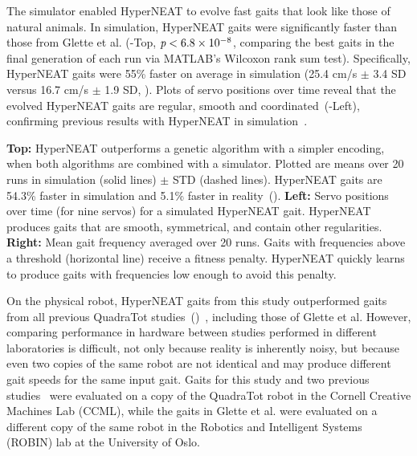 

The simulator enabled HyperNEAT to evolve
fast gaits that look like those of natural animals. In simulation, HyperNEAT gaits were significantly faster than those from Glette et al. (-Top, $\emph{p} < 6.8\times10^{-8}$, comparing the best gaits in the final generation of each run via MATLAB's Wilcoxon rank sum test).  
Specifically, HyperNEAT gaits were 55\% faster on average in simulation (25.4
cm/s $\pm$ 3.4 SD versus 16.7 cm/s $\pm$ 1.9 SD, ).
Plots of servo positions over time reveal that the evolved HyperNEAT gaits are regular, smooth and coordinated~(-Left), confirming previous results with HyperNEAT in simulation~\cite{clune2009evolving,clune2011performance}.

{
\textbf{Top: }
HyperNEAT outperforms a genetic algorithm with a simpler encoding, when both algorithms are combined with a simulator. Plotted are means over 20 runs in simulation (solid lines) $\pm$ STD (dashed lines). HyperNEAT gaits are 54.3\% faster in
simulation and 5.1\% faster in reality~().
\textbf{Left: }
Servo positions over time (for nine servos) for a simulated HyperNEAT gait. HyperNEAT produces gaits that are smooth, symmetrical, and contain other regularities. 
\textbf{Right: }Mean gait frequency averaged over 20 runs. 
Gaits with frequencies above a threshold (horizontal line) receive a fitness penalty. HyperNEAT quickly learns to produce gaits with frequencies low enough to avoid this penalty.
}


On the physical robot, HyperNEAT gaits from this study outperformed gaits from all previous QuadraTot studies~()~\cite{yos:clune,haocheng,glette}, including those of Glette et al. 
 However, comparing performance in hardware between studies performed in
different laboratories is difficult, not only because reality is
inherently noisy, but because even two copies of the same robot are
not identical and may produce different gait speeds for the same input
gait. Gaits for this study and two previous studies~\cite{yos:clune,haocheng} were evaluated on a copy of the QuadraTot robot in the Cornell Creative Machines Lab (CCML), while the gaits in Glette et al. were evaluated on a different copy of the same robot in the Robotics and
Intelligent Systems (ROBIN) lab at the University of Oslo.

